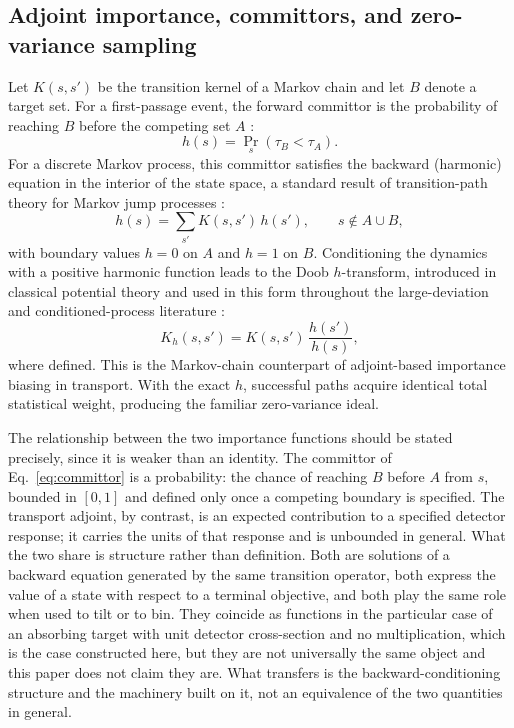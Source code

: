 \documentclass[a4paper,fleqn]{cas-sc}
\begin{document}
\subsection{Adjoint importance, committors, and zero-variance sampling}\label{sec:adjoint}
Let $K(s,s')$ be the transition kernel of a Markov chain and let $B$ denote a target set.
For a first-passage event, the forward committor is the probability of reaching $B$ before
the competing set $A$ \citep{e2006,metzner2009}:
\begin{equation}
h(s)=\Pr_{s}\!\left(\tau_B<\tau_A\right).
\label{eq:committor}
\end{equation}
For a discrete Markov process, this committor satisfies the backward (harmonic) equation in
the interior of the state space, a standard result of transition-path theory for Markov jump
processes \citep{e2006,metzner2009,vandeneijnden2010}:
\begin{equation}
h(s)=\sum_{s'}K(s,s')\,h(s'),\qquad s\notin A\cup B,
\label{eq:harmonic}
\end{equation}
with boundary values $h=0$ on $A$ and $h=1$ on $B$. Conditioning the dynamics with a
positive harmonic function leads to the Doob $h$-transform, introduced in classical potential
theory \citep{doob1984} and used in this form throughout the large-deviation and
conditioned-process literature \citep{touchette2009,chetrite2015}:
\begin{equation}
K_h(s,s')=K(s,s')\,\frac{h(s')}{h(s)},
\label{eq:doob}
\end{equation}
where defined. This is the Markov-chain counterpart of adjoint-based importance biasing in
transport. With the exact $h$, successful paths acquire identical total statistical weight,
producing the familiar zero-variance ideal.

The relationship between the two importance functions should be stated precisely, since it is
weaker than an identity. The committor of Eq.~\eqref{eq:committor} is a probability: the chance
of reaching $B$ before $A$ from $s$, bounded in $[0,1]$ and defined only once a competing
boundary is specified. The transport adjoint, by contrast, is an expected contribution to a
specified detector response; it carries the units of that response and is unbounded in
general. What the two share is structure rather than definition. Both are solutions of a
backward equation generated by the same transition operator, both express the value of a state
with respect to a terminal objective, and both play the same role when used to tilt or to bin.
They coincide as functions in the particular case of an absorbing target with unit detector
cross-section and no multiplication, which is the case constructed here, but they are not
universally the same object and this paper does not claim they are. What transfers is the
backward-conditioning structure and the machinery built on it, not an equivalence of the two
quantities in general.
\end{document}
